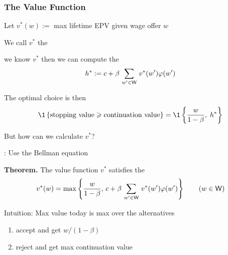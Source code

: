 \begin{frame}
    \frametitle{The Value Function}

    Let  $v^*(w) :=$ max lifetime EPV given wage offer $w$
    \vspace{0.4em}

    We call $v^*$ the 
    \vspace{0.4em}

     we know $v^*$ then we can compute the  
    \begin{equation*}
        h^* 
        := c + \beta \, \sum_{w' \in \mathsf W} \, v^*(w') \varphi(w') 
    \end{equation*}

    The optimal choice is then
    \begin{equation*}
         \1
        \left\{
            \text{stopping value} \geq \text{continuation value}
        \right\}
         = \1
        \left\{
            \frac{w}{1 - \beta}, \; h^*
        \right\}
    \end{equation*}


\end{frame}


\begin{frame}

    But how can we calculate $v^*$?

    \vspace{0.4em}
    : Use the Bellman equation 

    \vspace{0.4em}
    {\bf Theorem.} The value function $v^*$ satisfies the 
    \begin{equation*}
        v^*(w) = 
        \max \left\{
            \frac{w}{1-\beta}
            ,\,
            c + \beta \, \sum_{w' \in \mathsf W} \, v^*(w') \varphi(w')
            \right\}
            \qquad (w \in \mathsf W)
    \end{equation*}

    \vspace{0.4em}
    \vspace{0.4em}
    \vspace{0.4em}
    Intuition: Max value today is max over the alternatives
    \begin{enumerate}
        \item accept and get $w/(1-\beta)$
        \vspace{0.4em}
        \item reject and get max continuation value
    \end{enumerate}


\end{frame}


